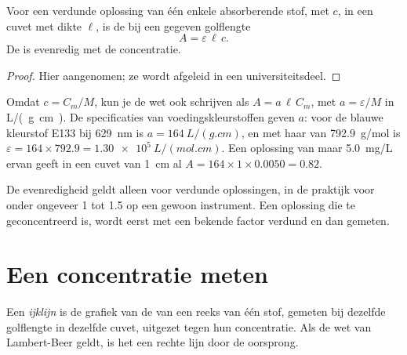 \begin{proposition}\label{prop:g11:absorbance:beer-lambert}
Voor een verdunde oplossing van één enkele absorberende stof, met  $c$, in een cuvet met dikte $\ell$, is de  bij
een gegeven golflengte
\[
  A = \varepsilon\, \ell\, c .
\]
De  is evenredig met de concentratie.
\end{proposition}

\begin{proof}
Hier aangenomen; ze wordt afgeleid in een universiteitsdeel.
\end{proof}


\begin{remark}\label{rem:g11:absorbance:mass}
Omdat $c = C_m / M$, kun je de wet ook schrijven als $A = a\, \ell\, C_m$,
met $a = \varepsilon / M$ in \si{L/(g.cm)}. De specificaties van
voedingskleurstoffen geven $a$: voor de blauwe kleurstof E133 bij
\qty{629}{nm} is $a =
\qty{164}{L/(g.cm)}$, en met haar  van \qty{792.9}{g/mol} is
$\varepsilon = 164 \times 792.9 = \qty{1.30e5}{L/(mol.cm)}$. Een oplossing
van maar \qty{5.0}{mg/L} ervan geeft in een cuvet van \qty{1}{cm} al
$A = 164 \times 1 \times 0.0050 = 0.82$.
\end{remark}

\begin{remark}\label{rem:g11:absorbance:dilute}
De evenredigheid geldt alleen voor verdunde oplossingen, in de praktijk
voor  onder ongeveer 1 tot 1.5 op een gewoon instrument. Een
oplossing die te geconcentreerd is, wordt eerst met een bekende factor
verdund en dan gemeten.
\end{remark}

\section{Een concentratie meten}

\begin{definition}[IJklijn]\label{def:g11:absorbance:calibration-line}
Een \emph{ijklijn} is de grafiek van de  van een
reeks  van één stof, gemeten bij dezelfde golflengte
in dezelfde cuvet, uitgezet tegen hun concentratie. Als de wet van
Lambert-Beer geldt, is het een rechte lijn door de oorsprong.
\end{definition}

